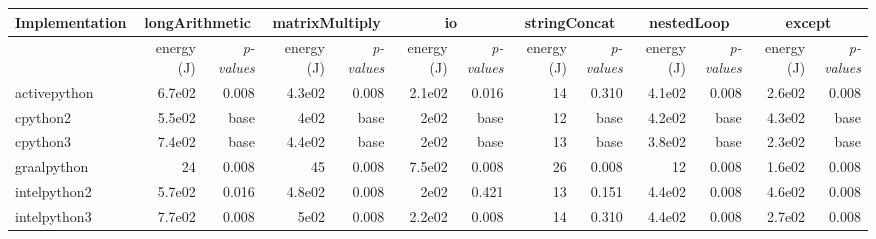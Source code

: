 \begin{table*}
{\begin{tabular}{l|rr|rr|rr|rr|rr|rr}
            Implementation & \multicolumn{2}{c}{longArithmetic} & \multicolumn{2}{c}{matrixMultiply} & \multicolumn{2}{c}{io} & \multicolumn{2}{c}{stringConcat} & \multicolumn{2}{c}{nestedLoop} & \multicolumn{2}{c}{except}                                                                                     \\
            \midrule
                           & energy (J)                         & \em p-values                       & energy (J)             & \em p-values                     & energy (J)                     & \em p-values               & energy (J) & \em p-values & energy (J) & \em p-values & energy (J) & \em p-values \\
            activepython   & 6.7e02                             & 0.008                              & 4.3e02                 & 0.008                            & 2.1e02                         & 0.016                      & 14         & 0.310        & 4.1e02     & 0.008        & 2.6e02     & 0.008        \\
            cpython2       & 5.5e02                             & base                             & 4e02                   & base                           & 2e02                           & base                     & 12         & base       & 4.2e02     & base       & 4.3e02     & base       \\
            cpython3       & 7.4e02                             & base                             & 4.4e02                 & base                           & 2e02                           & base                     & 13         & base       & 3.8e02     & base       & 2.3e02     & base       \\
            graalpython    & 24                                 & 0.008                              & 45                     & 0.008                            & 7.5e02                         & 0.008                      & 26         & 0.008        & 12         & 0.008        & 1.6e02     & 0.008        \\
            intelpython2   & 5.7e02                             & 0.016                              & 4.8e02                 & 0.008                            & 2e02                           & 0.421                      & 13         & 0.151        & 4.4e02     & 0.008        & 4.6e02     & 0.008        \\
            intelpython3   & 7.7e02                             & 0.008                              & 5e02                   & 0.008                            & 2.2e02                         & 0.008                      & 14         & 0.310        & 4.4e02     & 0.008        & 2.7e02     & 0.008        \\

\end{tabular}}
\end{table*}
